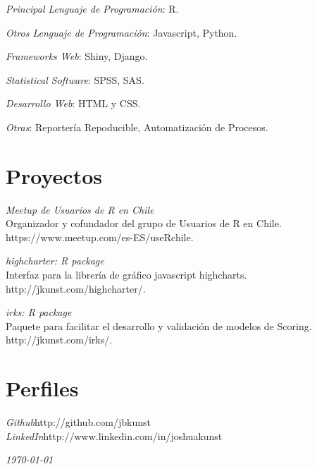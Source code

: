 \documentclass[margin]{res}
\begin{document}
\begin{resume}
    {\sl Principal Lenguaje de Programación}: R.
    
    {\sl Otros Lenguaje de Programación}: Javascript, Python.

    {\sl Frameworks Web}: Shiny, Django.

    {\sl Statistical Software}: SPSS, SAS.
    
    {\sl Desarrollo Web}: HTML y CSS.
    
    {\sl Otras}: Reportería Repoducible, Automatización de Procesos.

\vspace{1cm}

\section{Proyectos}

    {\sl Meetup de Usuarios de R en Chile}\\
    Organizador y cofundador del grupo de Usuarios de R en Chile.\\
    https://www.meetup.com/es-ES/useRchile.

    {\sl highcharter: R package}\\
    Interfaz para la librería de gráfico javascript highcharts.\\
    http://jkunst.com/highcharter/.
    
    {\sl irks: R package}\\
    Paquete para facilitar el desarrollo y validación de modelos
    de Scoring.\\
    http://jkunst.com/irks/.

\vspace{1cm}

\section{Perfiles}
    
    {\sl Github}\hfill http://github.com/jbkunst\\
    
    {\sl LinkedIn}\hfill http://www.linkedin.com/in/joshuakunst

\vspace{1cm}


\end{resume}

\vspace{0.5cm}

\hfill {\sl \today}
\end{document}
